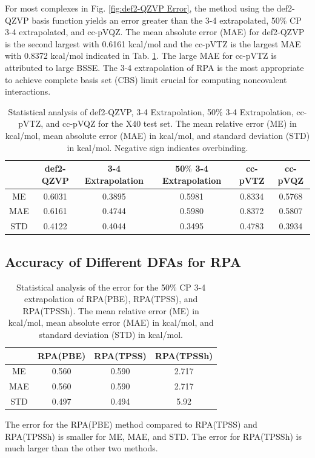 \documentclass[11pt]{article}
\begin{document}
For most complexes in Fig. \ref{fig:def2-QZVP Error}, the method using
the def2-QZVP basis function yields an error greater than the 3-4 extrapolated,
50$\%$ CP 3-4 extrapolated, and cc-pVQZ. The mean absolute error (MAE) for
def2-QZVP is the second largest with 0.6161 kcal/mol and the cc-pVTZ is the
largest MAE with 0.8372 kcal/mol indicated in Tab. \ref{tab:table_1}. The
large MAE for cc-pVTZ is attributed to large BSSE. The 3-4 extrapolation
of RPA is the most appropriate to achieve complete basis set (CBS) limit
crucial for computing noncovalent interactions.

\begin{table}[hbpt]
  \caption{Statistical analysis of def2-QZVP, 3-4 Extrapolation, 50$\%$ 3-4
    Extrapolation, cc-pVTZ, and cc-pVQZ for the X40 test set. The mean
    relative error (ME) in kcal/mol, mean absolute error (MAE) in kcal/mol,
    and standard deviation (STD) in kcal/mol. Negative sign indicates overbinding.}
  \centering
  \begin{tabular}{c|c|c|c|c|c}
    & def2-QZVP & 3-4 Extrapolation & 50$\%$ 3-4 Extrapolation & cc-pVTZ  &
    cc-pVQZ \\
    \hline\hline
    ME & 0.6031 & 0.3895 & 0.5981 & 0.8334 & 0.5768 \\
    MAE & 0.6161 & 0.4744 & 0.5980 & 0.8372 & 0.5807 \\
    STD & 0.4122 & 0.4044 & 0.3495 & 0.4783 & 0.3934 \\
  \end{tabular}
  \label{tab:table_1}
\end{table}

\subsection{Accuracy of Different DFAs for RPA}

\begin{table}[hbpt]
  \centering
  \caption{Statistical analysis of the error for the 50$\%$ CP 3-4
    extrapolation of RPA(PBE), RPA(TPSS), and RPA(TPSSh). The mean relative
    error (ME) in kcal/mol, mean absolute error (MAE) in kcal/mol, and
    standard deviation (STD) in kcal/mol.}
  \begin{tabular}{c|c|c|c}
    & RPA(PBE) & RPA(TPSS) & RPA(TPSSh) \\
    \hline\hline
    ME & 0.560 & 0.590 & 2.717 \\
    MAE & 0.560 & 0.590 & 2.717 \\
    STD & 0.497 & 0.494 & 5.92 \\
  \end{tabular}
  \label{tab:errors_RPA(DFA)}
\end{table}
The error for the RPA(PBE) method compared to RPA(TPSS) and RPA(TPSSh) is
smaller for ME, MAE, and STD. The error for RPA(TPSSh) is much larger than
the other two methods.
\end{document}
